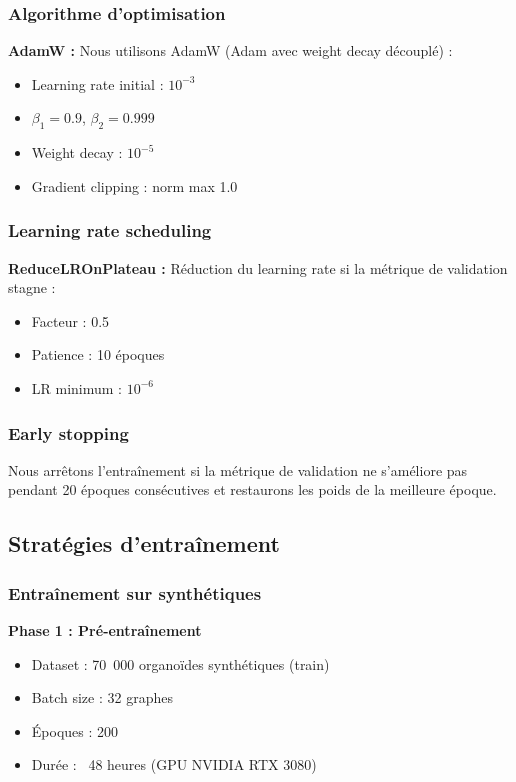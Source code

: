 \subsubsection{Algorithme d'optimisation}

\textbf{AdamW :}
Nous utilisons AdamW (Adam avec weight decay découplé) :
\begin{itemize}
    \item Learning rate initial : $10^{-3}$
    \item $\beta_1 = 0.9$, $\beta_2 = 0.999$
    \item Weight decay : $10^{-5}$
    \item Gradient clipping : norm max 1.0
\end{itemize}

\subsubsection{Learning rate scheduling}

\textbf{ReduceLROnPlateau :}
Réduction du learning rate si la métrique de validation stagne :
\begin{itemize}
    \item Facteur : 0.5
    \item Patience : 10 époques
    \item LR minimum : $10^{-6}$
\end{itemize}

\subsubsection{Early stopping}

Nous arrêtons l'entraînement si la métrique de validation ne s'améliore pas pendant 20 époques consécutives et restaurons les poids de la meilleure époque.

\subsection{Stratégies d'entraînement}

\subsubsection{Entraînement sur synthétiques}

\textbf{Phase 1 : Pré-entraînement}
\begin{itemize}
    \item Dataset : 70~000 organoïdes synthétiques (train)
    \item Batch size : 32 graphes
    \item Époques : 200
    \item Durée : ~48 heures (GPU NVIDIA RTX 3080)
\end{itemize}

